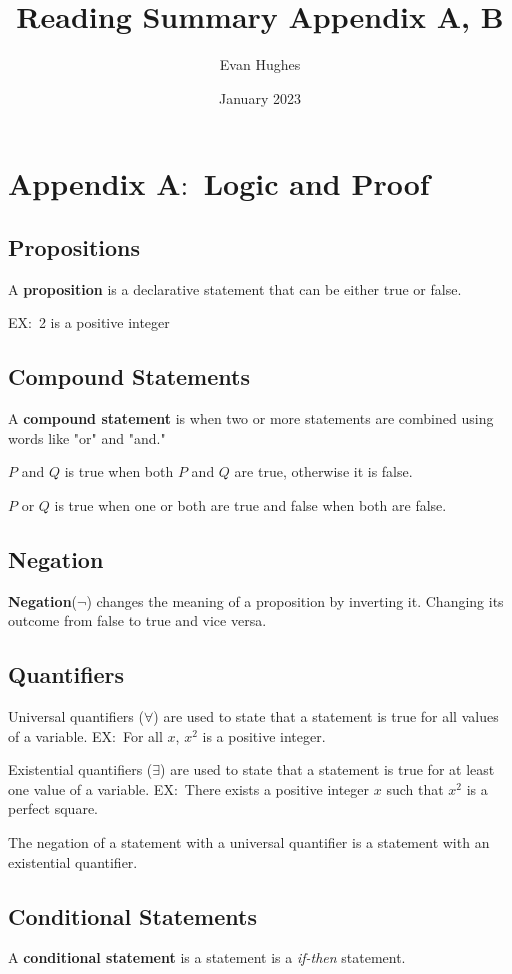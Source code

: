 \documentclass{article}
\title{Reading Summary Appendix A, B}
\author{Evan Hughes}
\date{January 2023}
\begin{document}
\maketitle
\section{Appendix A$\colon$ Logic and Proof}
\subsection*{Propositions}
A \textbf{proposition} is a declarative statement that can be either true or false.

EX$\colon$ 2 is a positive integer
\subsection*{Compound Statements}
A \textbf{compound statement} is when two or more statements are combined using words like "or" and "and."

$P$ and $Q$ is true when both $P$ and $Q$ are true, otherwise it is false.

$P$ or $Q$ is true when one or both are true and false when both are false.
\subsection*{Negation}
\textbf{Negation}($\lnot$) changes the meaning of a proposition by inverting it.
Changing its outcome from false to true and vice versa.

\subsection*{Quantifiers}
Universal quantifiers ($\forall$) are used to state that a statement is true for all values of a variable.
EX$\colon$ For all $x$, $x^2$ is a positive integer.


Existential quantifiers ($\exists$) are used to state that a statement is true for at least one value of a variable.
EX$\colon$ There exists a positive integer $x$ such that $x^2$ is a perfect square.


The negation of a statement with a universal quantifier
is a statement with an existential quantifier. 

\subsection*{Conditional Statements}
A \textbf{conditional statement} is a statement is a \emph{if-then} statement.
\end{document}
